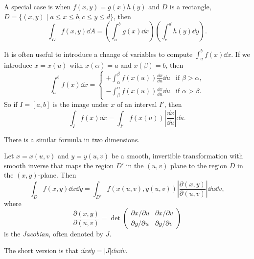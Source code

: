 A special case is when $f(x, y) = g(x)h(y)$ and $D$ is a rectangle, $D = \{(x, y) \mid a \leq x \leq b, c \leq y \leq d \}$, then
$$
\int_D f(x, y) \dd A = \left(\int_{a}^b g(x) \dd x\right)\left(\int_c^d h(y) \dd y\right).
$$

It is often useful to introduce a change of variables to compute $\int_a^b f(x) \dd x$.
If we introduce $x = x(u)$ with $x(\alpha) = a$ and $x(\beta) = b$, then
$$
\int_a^b f(x)\dd x = \begin{cases}
	+ \int_\alpha^\beta f(x(u)) \frac{\dd x}{\dd u} \dd u &\mbox{if } \beta > \alpha, \\
	- \int_\beta^\alpha f(x(u)) \frac{\dd x}{\dd u} \dd u  &\mbox{if } \alpha > \beta.
   \end{cases}
$$
So if $I = [a, b]$ is the image under $x$ of an interval $I'$, then
$$
\int_I f(x) \dd x = \int_{I'} f(x(u)) \left|\frac{\dd x}{\dd u}\right| \dd u.
$$

There is a similar formula in two dimensions.

\begin{proposition}
	Let $x = x(u, v)$ and $y = y(u, v)$ be a smooth, invertible transformation with smooth inverse that maps the region $D'$ in the $(u, v)$ plane to the region $D$ in the $(x, y)$-plane.
	Then
	$$
	\int_D f(x, y) \dd x \dd y = \int_{D'} f(x(u, v), y(u, v)) \left|\frac{\partial(x, y)}{\partial(u, v)}\right| \dd u \dd v,
	$$
	where
	$$
	\frac{\partial (x, y)}{\partial (u, v)} = \det\begin{pmatrix}
		\partial x/\partial u & \partial x / \partial v \\
		\partial y / \partial u & \partial y / \partial v
	\end{pmatrix}
	$$
	is the \emph{Jacobian}, often denoted by $J$.
\end{proposition}

The short version is that $\dd x \dd y = |J| \dd u \dd v$.

